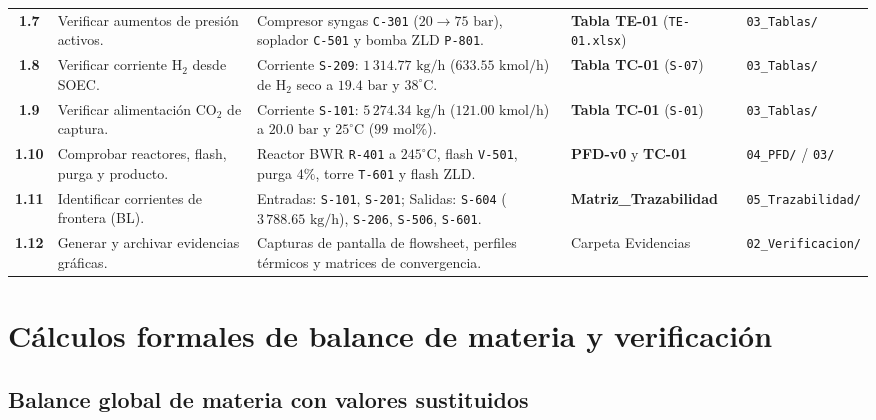 \documentclass[11pt,letterpaper]{article}
\begin{document}
\begin{center}
\begin{tabularx}{\textwidth}{cp{2.6cm}Xp{3.2cm}p{2.0cm}}
\textbf{1.7} & Verificar aumentos de presión activos. & Compresor syngas \texttt{C-301} ($20 \to 75\text{ bar}$), soplador \texttt{C-501} y bomba ZLD \texttt{P-801}. & \textbf{Tabla TE-01} (\texttt{TE-01.xlsx}) & \texttt{03\_Tablas/} \\
\textbf{1.8} & Verificar corriente $\text{H}_2$ desde SOEC. & Corriente \texttt{S-209}: $1\,314.77\text{ kg/h}$ ($633.55\text{ kmol/h}$) de $\text{H}_2$ seco a $19.4\text{ bar}$ y $38^\circ\text{C}$. & \textbf{Tabla TC-01} (\texttt{S-07}) & \texttt{03\_Tablas/} \\
\textbf{1.9} & Verificar alimentación $\text{CO}_2$ de captura. & Corriente \texttt{S-101}: $5\,274.34\text{ kg/h}$ ($121.00\text{ kmol/h}$) a $20.0\text{ bar}$ y $25^\circ\text{C}$ ($99\text{ mol\%}$). & \textbf{Tabla TC-01} (\texttt{S-01}) & \texttt{03\_Tablas/} \\
\textbf{1.10} & Comprobar reactores, flash, purga y producto. & Reactor BWR \texttt{R-401} a $245^\circ\text{C}$, flash \texttt{V-501}, purga $4\%$, torre \texttt{T-601} y flash ZLD. & \textbf{PFD-v0} y \textbf{TC-01} & \texttt{04\_PFD/} / \texttt{03/} \\
\textbf{1.11} & Identificar corrientes de frontera (BL). & Entradas: \texttt{S-101}, \texttt{S-201}; Salidas: \texttt{S-604} ($3\,788.65\text{ kg/h}$), \texttt{S-206}, \texttt{S-506}, \texttt{S-601}. & \textbf{Matriz\_Trazabilidad} & \texttt{05\_Trazabilidad/} \\
\textbf{1.12} & Generar y archivar evidencias gráficas. & Capturas de pantalla de flowsheet, perfiles térmicos y matrices de convergencia. & Carpeta Evidencias & \texttt{02\_Verificacion/} \\
\bottomrule
\end{tabularx}
\end{center}

\clearpage

\section{Cálculos formales de balance de materia y verificación}

\subsection{Balance global de materia con valores sustituidos}
\end{document}
